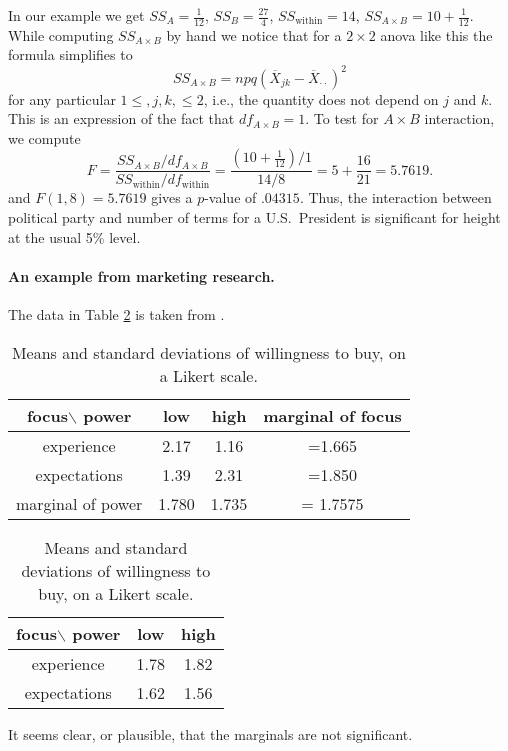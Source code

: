 In our example we get $SS_A=\frac1{12}$, $SS_B=\frac{27}4$, $SS_{\text{within}}=14$, $SS_{A\times B}=10+\frac1{12}$. While computing $SS_{A\times B}$ by hand we notice that for a $2\times 2$ anova like this the formula simplifies to
\[
	SS_{A\times B} = npq (\overline X_{jk}-\overline X_{\cdot\cdot})^2
\]
for any particular $1\le ,j, k,\le 2$, i.e., the quantity does not depend on $j$ and $k$. This is an expression of the fact that $df_{A\times B}=1$.
To test for $A\times B$ interaction, we compute
\[
	F = \frac{SS_{A\times B}/df_{A\times B}}{SS_{\text{within}}/df_{\text{within}}} = \frac{(10+\frac1{12})/1}{14/8} = 5+\frac{16}{21} = 5.7619.
\]
and $F(1,8)=5.7619$ gives a $p$-value of $.04315$. Thus, the interaction between political party and number of terms for a U.S.~President is significant for height at the usual 5\% level.

\paragraph{An example from marketing research.}
The data in Table \ref{RuckerHuGalinsky} is taken from .
\begin{table}
\centering
\begin{tabular}{|c|c|c|c|}
\hline
focus$\backslash$ power	&	low	& high & marginal of focus\\
\hline
experience			& 	2.17 & 1.16 & =1.665\\
expectations			&	1.39 & 2.31 & =1.850\\
\hline
marginal of power		&	1.780 & 1.735 & = 1.7575\\
\hline
\end{tabular}
\begin{tabular}{|c|c|c|}
\hline
focus$\backslash$ power	&	low	& high \\
\hline
experience			& 	1.78 & 1.82 \\
expectations			&	1.62 & 1.56 \\
\hline
\end{tabular}
\caption{Means and standard deviations of willingness to buy, on a Likert scale.}\label{RuckerHuGalinsky}
\end{table}

It seems clear, or plausible, that the marginals are not significant.

